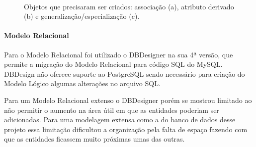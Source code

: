 \documentclass[12pt]{article}
\begin{document}
\begin{figure}[H]
\centering
\mbox{\quad
{}}
\caption{Objetos que precisaram ser criados: associação (a), atributo derivado (b) e generalização/especialização (c).}
\label{fig6}
\end{figure}

\paragraph{Modelo Relacional\newline}

Para o Modelo Relacional foi utilizado o DBDesigner na sua 4ª versão, que permite a migração do Modelo Relacional para código SQL do MySQL. DBDesign não oferece suporte ao PostgreSQL sendo necessário para criação do Modelo Lógico algumas alterações no arquivo SQL. 

Para um Modelo Relacional extenso o DBDesigner porém se mostrou limitado ao não permitir o aumento na área útil em que as entidades poderiam ser adicionadas. Para uma modelagem extensa como a do banco de dados desse projeto essa limitação dificultou a organização pela falta de espaço fazendo com que as entidades ficassem muito próximas umas das outras. 
\end{document}
